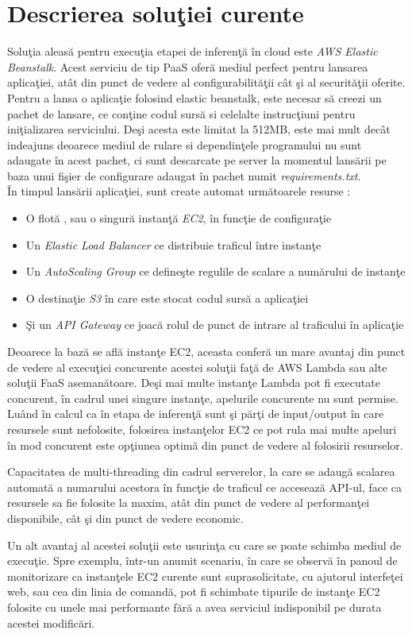 \documentclass[a4paper,12pt]{report}
\begin{document}
\section{Descrierea soluţiei curente}
\quad Soluţia aleasă pentru execuţia etapei de inferenţă în cloud este \emph{AWS Elastic Beanstalk}. Acest serviciu de tip PaaS oferă mediul perfect pentru lansarea aplicaţiei, atât din punct de vedere al configurabilităţii cât şi al securităţii oferite. 
Pentru a lansa o aplicaţie folosind elastic beanstalk, este necesar să creezi un pachet de lansare, ce conţine codul sursă si celelalte instrucţiuni pentru iniţializarea serviciului. Deşi acesta este limitat la 512MB, este mai mult decât indeajuns deoarece mediul de rulare si dependinţele programului nu sunt adaugate în acest pachet, ci sunt descarcate pe server la momentul lansării pe baza unui fişier de configurare adaugat în pachet numit \emph{requirements.txt}.\\
În timpul lansării aplicaţiei, sunt create automat următoarele resurse : 
\begin{itemize}
\item O flotă , sau o singură instanţă \emph{EC2}, în funcţie de configuraţie
\item Un \emph{Elastic Load Balancer} ce distribuie traficul între instanţe
\item Un \emph{AutoScaling Group} ce defineşte regulile de scalare a numărului de instanţe
\item O destinaţie \emph{S3} în care este stocat codul sursă a aplicaţiei
\item Şi un \emph{API Gateway} ce joacă rolul de punct de intrare al traficului în aplicaţie
\end{itemize}
\par Deoarece la bază se află instanţe EC2, aceasta conferă un mare avantaj din punct de vedere al execuţiei concurente acestei soluţii faţă de AWS Lambda sau alte soluţii FaaS asemanătoare. Deşi mai multe instanţe Lambda pot fi executate concurent, în cadrul unei singure instanţe, apelurile concurente nu sunt permise. Luând în calcul ca în etapa de inferenţă sunt şi părţi de input/output în care resursele sunt nefolosite, folosirea instanţelor EC2 ce pot rula mai multe apeluri în mod concurent este opţiunea optimă din punct de vedere al folosirii resurselor. 
\par Capacitatea de multi-threading din cadrul serverelor, la care se adaugă scalarea automată a numarului acestora în funcţie de traficul ce accesează API-ul, face ca resursele sa fie folosite la maxim, atât din punct de vedere al performanţei disponibile, cât şi din punct de vedere economic. 
\par Un alt avantaj al acestei soluţii este usurinţa cu care se poate schimba mediul de execuţie. Spre exemplu, într-un anumit scenariu, în care se observă în panoul de monitorizare ca instanţele EC2 curente sunt suprasolicitate, cu ajutorul interfeţei web, sau cea din linia de comandă, pot fi schimbate tipurile de instanţe EC2 folosite cu unele mai performante fără a avea serviciul indisponibil pe durata acestei modificări.


\listoffigures
\listoftables

\end{document}
